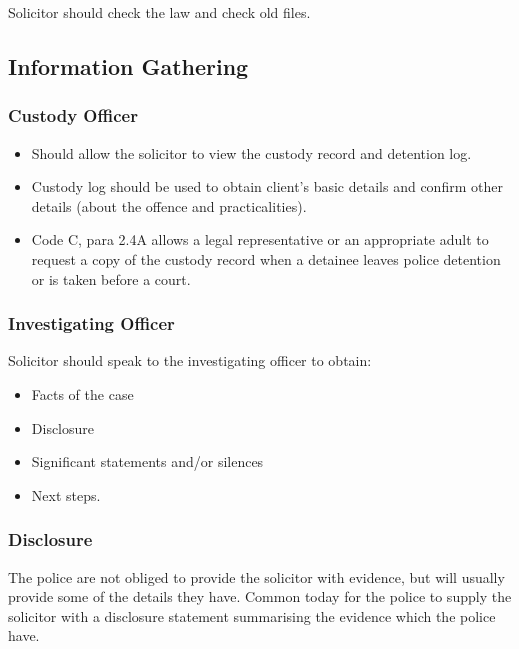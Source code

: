 \documentclass[
]{article}
\providecommand{\tightlist}{%
  \setlength{\itemsep}{0pt}\setlength{\parskip}{0pt}}
\begin{document}
Solicitor should check the law and check old files.

\hypertarget{information-gathering}{%
\subsection{Information Gathering}\label{information-gathering}}

\hypertarget{custody-officer-1}{%
\subsubsection{Custody Officer}\label{custody-officer-1}}

\begin{itemize}
\tightlist
\item
  Should allow the solicitor to view the custody record and detention
  log.
\item
  Custody log should be used to obtain client's basic details and
  confirm other details (about the offence and practicalities).
\item
  Code C, para 2.4A allows a legal representative or an appropriate
  adult to request a copy of the custody record when a detainee leaves
  police detention or is taken before a court.
\end{itemize}

\hypertarget{investigating-officer}{%
\subsubsection{Investigating Officer}\label{investigating-officer}}

Solicitor should speak to the investigating officer to obtain:

\begin{itemize}
\tightlist
\item
  Facts of the case
\item
  Disclosure
\item
  Significant statements and/or silences
\item
  Next steps.
\end{itemize}

\hypertarget{disclosure}{%
\subsubsection{Disclosure}\label{disclosure}}

The police are not obliged to provide the solicitor with evidence, but
will usually provide some of the details they have. Common today for the
police to supply the solicitor with a disclosure statement summarising
the evidence which the police have.
\end{document}

